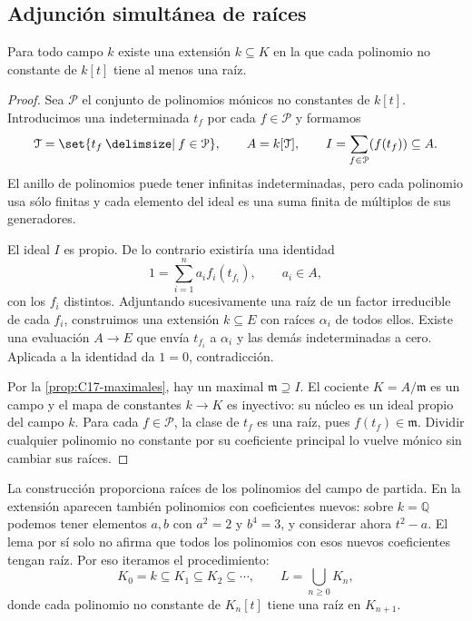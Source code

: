 \subsection{Adjunción simultánea de raíces}\label{tema:24-2-1}
\begin{lema}\label{lema:C24-raiz-simultanea}
Para todo campo $k$ existe una extensión $k\subseteq K$ en la que cada polinomio no constante de $k[t]$ tiene al menos una raíz.
\end{lema}
\begin{proof}
Sea $\mathcal P$ el conjunto de polinomios mónicos no constantes de $k[t]$. Introducimos una indeterminada $t_f$ por cada $f\in\mathcal P$ y formamos
\[
\mathcal T=\set{t_f\given f\in\mathcal P},\qquad A=k[\mathcal T],\qquad
I=\sum_{f\in\mathcal P}(f(t_f))\subseteq A.
\]
El anillo de polinomios puede tener infinitas indeterminadas, pero cada polinomio usa sólo finitas y cada elemento del ideal es una suma finita de múltiplos de sus generadores.

El ideal $I$ es propio. De lo contrario existiría una identidad
\[
1=\sum_{i=1}^n a_i f_i(t_{f_i}),\qquad a_i\in A,
\]
con los $f_i$ distintos. Adjuntando sucesivamente una raíz de un factor irreducible de cada $f_i$, construimos una extensión $k\subseteq E$ con raíces $\alpha_i$ de todos ellos. Existe una evaluación $A\to E$ que envía $t_{f_i}$ a $\alpha_i$ y las demás indeterminadas a cero. Aplicada a la identidad da $1=0$, contradicción.

Por la \cref{prop:C17-maximales}, hay un maximal $\mathfrak m\supseteq I$. El cociente $K=A/\mathfrak m$ es un campo y el mapa de constantes $k\to K$ es inyectivo: su núcleo es un ideal propio del campo $k$. Para cada $f\in\mathcal P$, la clase de $t_f$ es una raíz, pues $f(t_f)\in\mathfrak m$. Dividir cualquier polinomio no constante por su coeficiente principal lo vuelve mónico sin cambiar sus raíces.
\end{proof}

La construcción proporciona raíces de los polinomios del campo de partida. En la extensión aparecen también polinomios con coeficientes nuevos: sobre $k=\mathbb Q$ podemos tener elementos $a,b$ con $a^2=2$ y $b^4=3$, y considerar ahora $t^2-a$. El lema por sí solo no afirma que todos los polinomios con esos nuevos coeficientes tengan raíz. Por eso iteramos el procedimiento:
\[
K_0=k\subseteq K_1\subseteq K_2\subseteq\cdots,
\qquad L=\bigcup_{n\geq0}K_n,
\]
donde cada polinomio no constante de $K_n[t]$ tiene una raíz en $K_{n+1}$.

